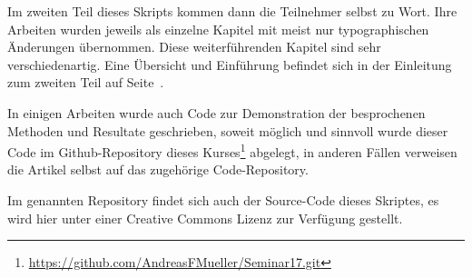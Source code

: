 Im zweiten Teil dieses Skripts kommen dann die Teilnehmer selbst zu Wort.
Ihre Arbeiten wurden jeweils als einzelne
Kapitel mit meist nur typographischen Änderungen übernommen.
Diese weiterführenden Kapitel sind sehr verschiedenartig.
Eine Übersicht und Einführung befindet sich in der Einleitung
zum zweiten Teil auf Seite~\pageref{skript:uebersicht}.

In einigen Arbeiten wurde auch Code zur Demonstration der 
besprochenen Methoden und Resultate geschrieben, soweit
möglich und sinnvoll wurde dieser Code im Github-Repository
dieses Kurses\footnote{\url{https://github.com/AndreasFMueller/Seminar17.git}}
abgelegt, in anderen Fällen verweisen die Artikel selbst auf
das zugehörige Code-Repository.

Im genannten Repository findet sich auch der Source-Code dieses
Skriptes, es wird hier unter einer Creative Commons Lizenz
zur Verfügung gestellt.

